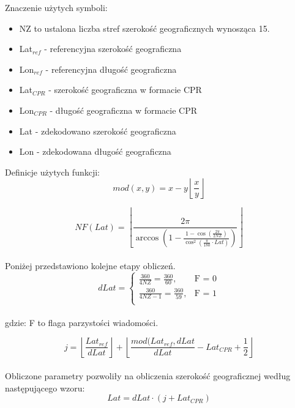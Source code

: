 \documentclass[eng,printmode]{mgr}
\newcommand{\floor}[1]{\left\lfloor #1 \right\rfloor}
\begin{document}
\noindent
Znaczenie użytych symboli:
\begin{itemize}
\item NZ to ustalona liczba stref szerokość geograficznych wynosząca 15.
\item Lat$_{ref}$ - referencyjna szerokość geograficzna
\item Lon$_{ref}$ - referencyjna długość geograficzna
\item Lat$_{CPR}$ - szerokość geograficzna w formacie CPR
\item Lon$_{CPR}$ - długość geograficzna w formacie CPR
\item Lat - zdekodowano szerokość geograficzna
\item Lon - zdekodowana długość geograficzna
\end{itemize}
\noindent
Definicje użytych funkcji:
\begin{equation}
mod(x, y) = x - y\floor{\frac{x}{y}}
\end{equation}

\begin{equation}
NF(Lat) = \floor{\frac{2\pi}{\arccos\left(1 - \frac{1 - \cos\left(\frac{2\pi}{2NZ}\right)}{\cos^2\left(\frac{\pi}{180} \cdot Lat\right)}\right)}}
\end{equation}
\\

\noindent
Poniżej przedstawiono kolejne etapy obliczeń.
\begin{equation}
\renewcommand*{\arraystretch}{1.3}
dLat= \left\{ \begin{array}{ll}

\frac{360}{4NZ} = \frac{360}{60}, & \textrm{F = 0}\\
\frac{360}{4NZ - 1} = \frac{360}{59}, & \textrm{F = 1}\\

\end{array} \right.
\end{equation}
\\
gdzie: F to flaga parzystości wiadomości.

\begin{equation}
j = \floor{\frac{Lat_{ref}}{dLat}} + \floor{\frac{mod(Lat_{ref},dLat}{dLat} - Lat_{CPR} + \frac{1}{2}}
\end{equation}
\\

Obliczone parametry pozwoliły na obliczenia szerokość geograficznej według następującego wzoru:
\begin{equation}
Lat = dLat \cdot \left(j + Lat_{CPR}\right)
\end{equation}
\end{document}
